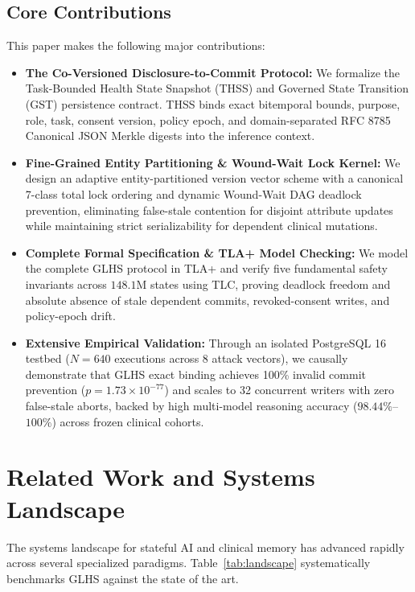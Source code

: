 \documentclass[11pt,a4paper]{article}
\begin{document}
\subsection{Core Contributions}
This paper makes the following major contributions:
\begin{itemize}
  \item \textbf{The Co-Versioned Disclosure-to-Commit Protocol:} We formalize the Task-Bounded Health State Snapshot (THSS) and Governed State Transition (GST) persistence contract. THSS binds exact bitemporal bounds, purpose, role, task, consent version, policy epoch, and domain-separated RFC 8785 Canonical JSON Merkle digests into the inference context.
  \item \textbf{Fine-Grained Entity Partitioning \& Wound-Wait Lock Kernel:} We design an adaptive entity-partitioned version vector scheme with a canonical 7-class total lock ordering and dynamic Wound-Wait DAG deadlock prevention, eliminating false-stale contention for disjoint attribute updates while maintaining strict serializability for dependent clinical mutations.
  \item \textbf{Complete Formal Specification \& TLA+ Model Checking:} We model the complete GLHS protocol in TLA+ and verify five fundamental safety invariants across $148.1\text{M}$ states using TLC, proving deadlock freedom and absolute absence of stale dependent commits, revoked-consent writes, and policy-epoch drift.
  \item \textbf{Extensive Empirical Validation:} Through an isolated PostgreSQL 16 testbed ($N=640$ executions across 8 attack vectors), we causally demonstrate that GLHS exact binding achieves 100\% invalid commit prevention ($p = 1.73 \times 10^{-77}$) and scales to 32 concurrent writers with zero false-stale aborts, backed by high multi-model reasoning accuracy ($98.44\%$--$100\%$) across frozen clinical cohorts.
\end{itemize}

\section{Related Work and Systems Landscape}
The systems landscape for stateful AI and clinical memory has advanced rapidly across several specialized paradigms. Table~\ref{tab:landscape} systematically benchmarks GLHS against the state of the art.
\end{document}
